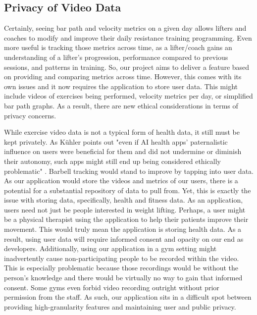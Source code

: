 \documentclass[10pt,twocolumn]{article}
\begin{document}
\subsection{Privacy of Video Data}
Certainly, seeing bar path and velocity metrics on a given day allows lifters and coaches to modify and improve their daily resistance training programming.
Even more useful is tracking those metrics across time, as a lifter/coach gains an understanding of a lifter's progression, performance compared to previous sessions, and patterns in training.
So, our project aims to deliver a feature based on providing and comparing metrics across time. 
However, this comes with its own issues and it now requires the application to store user data. 
This might include videos of exercises being performed, velocity metrics per day, or simplified bar path graphs. 
As a result, there are new ethical considerations in terms of privacy concerns. \par

While exercise video data is not a typical form of health data, it still must be kept privately.
As Kühler points out "even if AI health apps’ paternalistic influence on users were beneficial for them and did not undermine or diminish their autonomy, such apps might still end up being considered ethically problematic" \cite{Kuhler2022}. 
Barbell tracking would stand to improve by tapping into user data. 
As our application would store the videos and metrics of our users, there is a potential for a substantial repository of data to pull from. 
Yet, this is exactly the issue with storing data, specifically, health and fitness data. 
As an application, users need not just be people interested in weight lifting.
Perhaps, a user might be a physical therapist using the application to help their patients improve their movement. 
This would truly mean the application is storing health data. 
As a result, using user data will require informed consent and opacity on our end as developers. 
Additionally, using our application in a gym setting might inadvertently cause non-participating people to be recorded within the video. 
This is especially problematic because those recordings would be without the person's knowledge and there would be virtually no way to gain that informed consent.
Some gyms even forbid video recording outright without prior permission from the staff.
As such, our application sits in a difficult spot between providing high-granularity features and maintaining user and public privacy. \par
\end{document}
